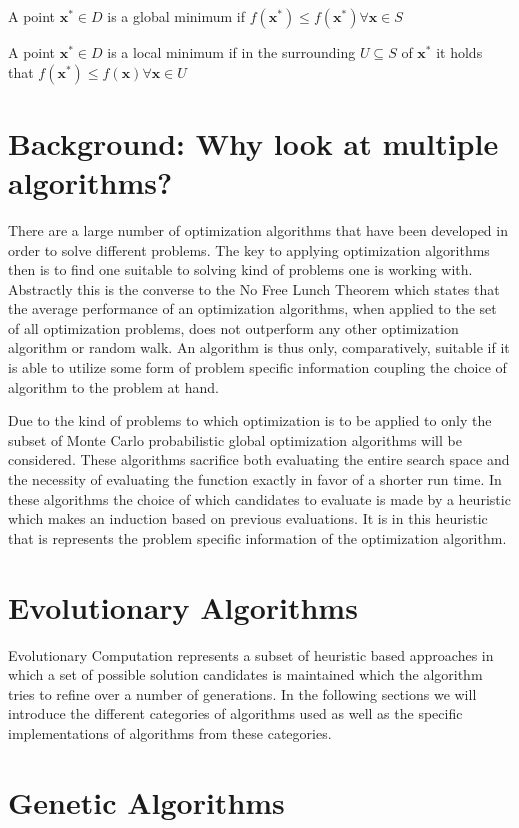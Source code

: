 \documentclass[a4paper,titlepage]{report}
\begin{document}
\noindent
A point $\mathbf{x}^* \in D$ is a global minimum if  $ f(\mathbf{x}^*) \leq f(\mathbf{x}^*)  \forall  \mathbf{x} \in S$

\noindent
A point $\mathbf{x}^* \in D$ is a local minimum if  in the surrounding  $ U \subseteq S$ of  $\mathbf{x}^*$ it holds that $f(\mathbf{x}^*)  \leq f(\mathbf{x})  \forall  \mathbf{x} \in U$


\section{Background: Why look at multiple algorithms?}
There are a large number of optimization algorithms that have been developed in order to solve different problems. The key to applying optimization algorithms then is to find one suitable to solving kind of problems one is working with. Abstractly this is the converse to the No Free Lunch Theorem which states that the average performance of an optimization algorithms, when applied to the set of all optimization problems,  does not outperform any other optimization algorithm or random walk. An algorithm is thus only, comparatively, suitable if it is able to utilize some form of problem specific information coupling the choice of algorithm to the problem at hand.

Due to the kind of problems to which optimization is to be applied to only the subset of Monte Carlo probabilistic global optimization algorithms will be considered. These algorithms sacrifice both evaluating the entire search space and the necessity of evaluating the function exactly in favor of a shorter run time. In these algorithms the choice of which candidates to evaluate is made by a heuristic which makes an induction based on previous evaluations. It is in this heuristic that is represents the problem specific information of the optimization algorithm.


\section{Evolutionary Algorithms}

Evolutionary Computation represents a subset of heuristic based approaches in which a set of possible solution candidates is maintained which the algorithm tries to refine over a number of generations. In the following sections we will introduce the different categories of algorithms used as well as the specific implementations of algorithms from these categories. 


\section{Genetic Algorithms}
\end{document}

